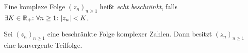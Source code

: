 \begin{frameddefn}
	Eine komplexe Folge $(z_n)_{n\geq 1}$ heißt \textit{echt beschränkt}, falls $\exists K \in \mathbb{R}_+{:}\  \forall n \geq 1{:}\  |z_n| < K$.
\end{frameddefn}

\begin{framedthm}
	Sei $(z_n)_{n\geq 1}$ eine beschränkte Folge komplexer Zahlen. Dann besitzt $(z_n)_{n\geq 1}$ eine konvergente Teilfolge.
\end{framedthm}
